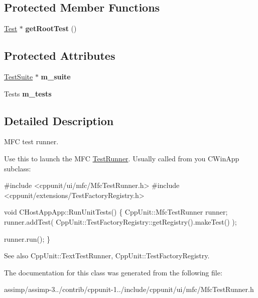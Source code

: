 \subsection*{Protected Member Functions}
\begin{DoxyCompactItemize}
\item 
\hypertarget{class_mfc_test_runner_ad810643faf74943741660ca94b9811ee}{\hyperlink{class_test}{Test} $\ast$ {\bfseries get\+Root\+Test} ()}\label{class_mfc_test_runner_ad810643faf74943741660ca94b9811ee}

\end{DoxyCompactItemize}
\subsection*{Protected Attributes}
\begin{DoxyCompactItemize}
\item 
\hypertarget{class_mfc_test_runner_a7700f0b285e70f42f3e84b56be890658}{\hyperlink{class_test_suite}{Test\+Suite} $\ast$ {\bfseries m\+\_\+suite}}\label{class_mfc_test_runner_a7700f0b285e70f42f3e84b56be890658}

\item 
\hypertarget{class_mfc_test_runner_a041d453efb2f9e262676f1d68f1c22af}{Tests {\bfseries m\+\_\+tests}}\label{class_mfc_test_runner_a041d453efb2f9e262676f1d68f1c22af}

\end{DoxyCompactItemize}


\subsection{Detailed Description}
M\+F\+C test runner.

Use this to launch the M\+F\+C \hyperlink{class_test_runner}{Test\+Runner}. Usually called from you C\+Win\+App subclass\+: 


\begin{DoxyCode}
\textcolor{preprocessor}{#include <cppunit/ui/mfc/MfcTestRunner.h>}
\textcolor{preprocessor}{#include <cppunit/extensions/TestFactoryRegistry.h>}

\textcolor{keywordtype}{void} 
CHostAppApp::RunUnitTests()
\{
  CppUnit::MfcTestRunner runner;
  runner.addTest( CppUnit::TestFactoryRegistry::getRegistry().makeTest() );

  runner.run();    
\}
\end{DoxyCode}
 \begin{DoxySeeAlso}{See also}
Cpp\+Unit\+::\+Text\+Test\+Runner, Cpp\+Unit\+::\+Test\+Factory\+Registry. 
\end{DoxySeeAlso}


The documentation for this class was generated from the following file\+:\begin{DoxyCompactItemize}
\item 
assimp/assimp-\/3../contrib/cppunit-\/1../include/cppunit/ui/mfc/Mfc\+Test\+Runner.\+h\end{DoxyCompactItemize}
